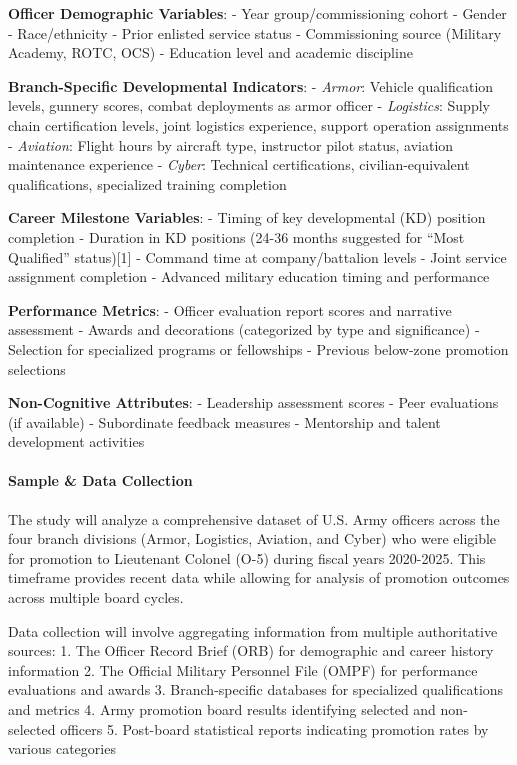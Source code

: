 \documentclass[./main.tex]{subfiles}
\begin{document}
\textbf{Officer Demographic Variables}: - Year group/commissioning
cohort - Gender - Race/ethnicity - Prior enlisted service status -
Commissioning source (Military Academy, ROTC, OCS) - Education level and
academic discipline

\textbf{Branch-Specific Developmental Indicators}: - \emph{Armor}:
Vehicle qualification levels, gunnery scores, combat deployments as
armor officer - \emph{Logistics}: Supply chain certification levels,
joint logistics experience, support operation assignments -
\emph{Aviation}: Flight hours by aircraft type, instructor pilot status,
aviation maintenance experience - \emph{Cyber}: Technical
certifications, civilian-equivalent qualifications, specialized training
completion

\textbf{Career Milestone Variables}: - Timing of key developmental (KD)
position completion - Duration in KD positions (24-36 months suggested
for ``Most Qualified'' status){[}1{]} - Command time at
company/battalion levels - Joint service assignment completion -
Advanced military education timing and performance

\textbf{Performance Metrics}: - Officer evaluation report scores and
narrative assessment - Awards and decorations (categorized by type and
significance) - Selection for specialized programs or fellowships -
Previous below-zone promotion selections

\textbf{Non-Cognitive Attributes}: - Leadership assessment scores - Peer
evaluations (if available) - Subordinate feedback measures - Mentorship
and talent development activities

\paragraph{Sample \& Data Collection}\label{sample-data-collection}

The study will analyze a comprehensive dataset of U.S. Army officers
across the four branch divisions (Armor, Logistics, Aviation, and Cyber)
who were eligible for promotion to Lieutenant Colonel (O-5) during
fiscal years 2020-2025. This timeframe provides recent data while
allowing for analysis of promotion outcomes across multiple board
cycles.

Data collection will involve aggregating information from multiple
authoritative sources: 1. The Officer Record Brief (ORB) for demographic
and career history information 2. The Official Military Personnel File
(OMPF) for performance evaluations and awards 3. Branch-specific
databases for specialized qualifications and metrics 4. Army promotion
board results identifying selected and non-selected officers 5.
Post-board statistical reports indicating promotion rates by various
categories
\end{document}
